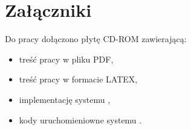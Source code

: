 \newpage\section{Załączniki}
Do pracy dołączono płytę CD-ROM zawierającą:
\begin{itemize}
	\item treść pracy w pliku PDF,
	\item treść pracy w formacie LATEX,
	\item implementację systemu \textsl{\NazwaSys},
	\item kody uruchomieniowne systemu \textsl{\NazwaSys}. 
\end{itemize} 
